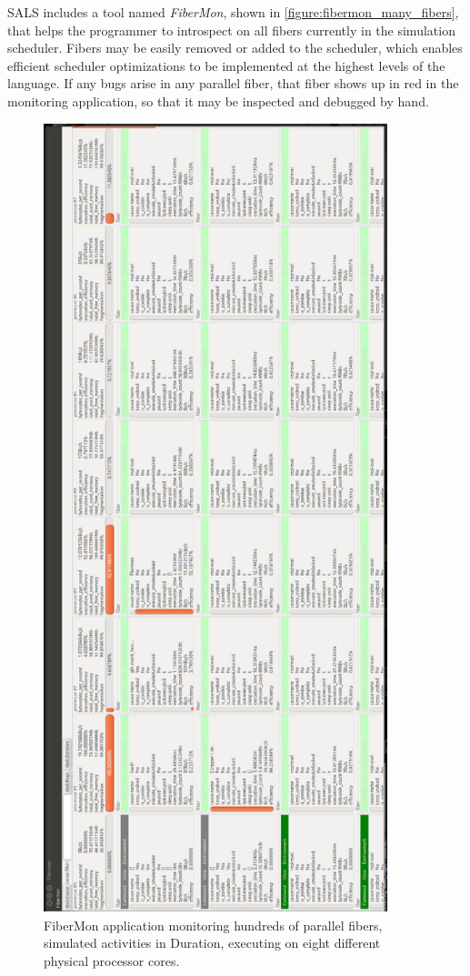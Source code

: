 SALS includes a tool named \emph{FiberMon}, shown in
\autoref{figure:fibermon_many_fibers}, that helps the programmer to
introspect on all fibers currently in the simulation scheduler.
Fibers may be easily removed or added to the scheduler, which enables
efficient scheduler optimizations to be implemented at the highest
levels of the language.  If any bugs arise in any parallel fiber, that
fiber shows up in red in the monitoring application, so that it may be
inspected and debugged by hand.
\begin{figure}[bth]
  \center
  \includegraphics[width=10cm]{gfx/fibermon_many_fibers}
  \caption[FiberMon application monitoring many fibers]{FiberMon
    application monitoring hundreds of parallel fibers, simulated
    activities in Duration, executing on eight different physical
    processor cores.}
  \label{figure:fibermon_many_fibers}
\end{figure}

